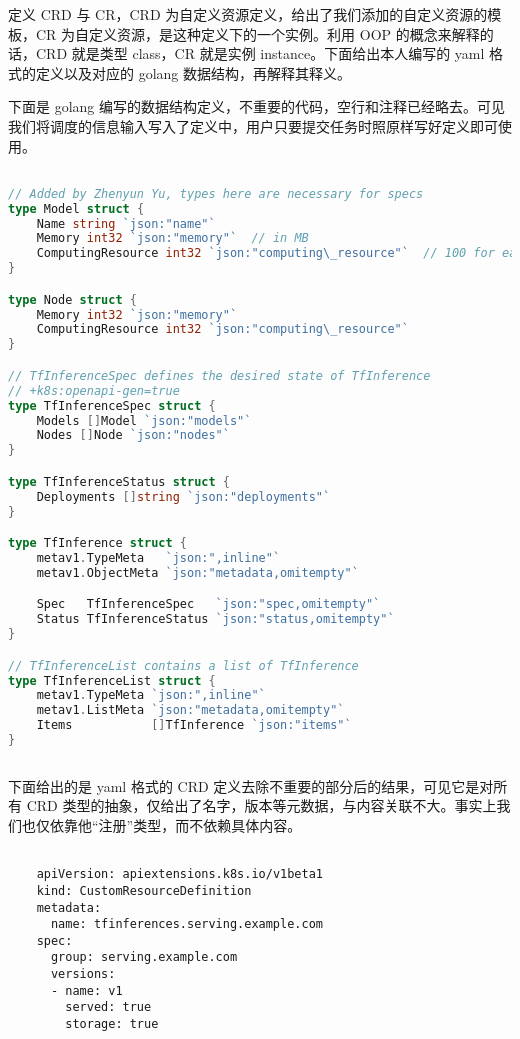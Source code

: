 定义 CRD 与 CR，CRD 为自定义资源定义，给出了我们添加的自定义资源的模板，CR 为自定义资源，是这种定义下的一个实例。利用 OOP 的概念来解释的话，CRD 就是类型 class，CR 就是实例 instance。下面给出本人编写的 yaml 格式的定义以及对应的 golang 数据结构，再解释其释义。

下面是 golang 编写的数据结构定义，不重要的代码，空行和注释已经略去。可见我们将调度的信息输入写入了定义中，用户只要提交任务时照原样写好定义即可使用。

\begin{lstlisting}[language=go]

// Added by Zhenyun Yu, types here are necessary for specs
type Model struct {
    Name string `json:"name"`
    Memory int32 `json:"memory"`  // in MB
    ComputingResource int32 `json:"computing\_resource"`  // 100 for each core
}

type Node struct {
    Memory int32 `json:"memory"`
    ComputingResource int32 `json:"computing\_resource"`
}

// TfInferenceSpec defines the desired state of TfInference
// +k8s:openapi-gen=true
type TfInferenceSpec struct {
    Models []Model `json:"models"`
    Nodes []Node `json:"nodes"`
}

type TfInferenceStatus struct {
    Deployments []string `json:"deployments"`
}

type TfInference struct {
    metav1.TypeMeta   `json:",inline"`
    metav1.ObjectMeta `json:"metadata,omitempty"`

    Spec   TfInferenceSpec   `json:"spec,omitempty"`
    Status TfInferenceStatus `json:"status,omitempty"`
}

// TfInferenceList contains a list of TfInference
type TfInferenceList struct {
    metav1.TypeMeta `json:",inline"`
    metav1.ListMeta `json:"metadata,omitempty"`
    Items           []TfInference `json:"items"`
}
    
\end{lstlisting}

下面给出的是 yaml 格式的 CRD 定义去除不重要的部分后的结果，可见它是对所有 CRD 类型的抽象，仅给出了名字，版本等元数据，与内容关联不大。事实上我们也仅依靠他“注册”类型，而不依赖具体内容。

\begin{lstlisting}

    apiVersion: apiextensions.k8s.io/v1beta1
    kind: CustomResourceDefinition
    metadata:
      name: tfinferences.serving.example.com
    spec:
      group: serving.example.com
      versions:
      - name: v1
        served: true
        storage: true

\end{lstlisting}


